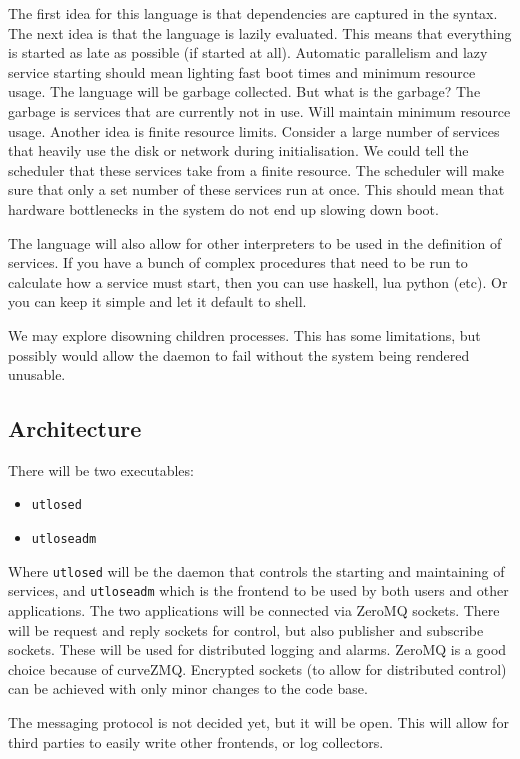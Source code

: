 \documentclass{article}
\begin{document}
The first idea for this language is that dependencies are captured in the syntax. The next idea
is that the language is lazily evaluated. This means that everything is started as late as possible
(if started at all). Automatic parallelism and lazy service starting should mean lighting fast
boot times and minimum resource usage. The language will be garbage collected. But what is
the garbage? The garbage is services that are currently not in use. Will maintain minimum
resource usage. Another idea is finite resource limits. Consider a large number of services
that heavily use the disk or network during initialisation. We could tell the scheduler that
these services take from a finite resource. The scheduler will make sure that only a set number
of these services run at once. This should mean that hardware bottlenecks in the system do not
end up slowing down boot.

The language will also allow for other interpreters to be used in the definition of
services. If you have a bunch of complex procedures that need to be run to calculate how a service
must start, then you can use haskell, lua python (etc). Or you can keep it simple and let it
default to shell.

We may explore disowning children processes. This has some limitations, but possibly would allow
the daemon to fail without the system being rendered unusable.

\subsection{Architecture}
There will be two executables:
\begin{itemize}
  \item \texttt{utlosed}
  \item \texttt{utloseadm}
\end{itemize}
Where \texttt{utlosed} will be the daemon that controls the starting and maintaining of services, and
\texttt{utloseadm} which is the frontend to be used by both users and other applications.
The two applications will be connected via ZeroMQ sockets. There will be request and reply sockets
for control, but also publisher and subscribe sockets. These will be used for distributed logging and alarms.
ZeroMQ is a good choice because of curveZMQ. Encrypted sockets (to allow for distributed control)
can be achieved with only minor changes to the code base.

The messaging protocol is not decided yet, but it will be open. This will allow for third parties to easily
write other frontends, or log collectors.
\end{document}
